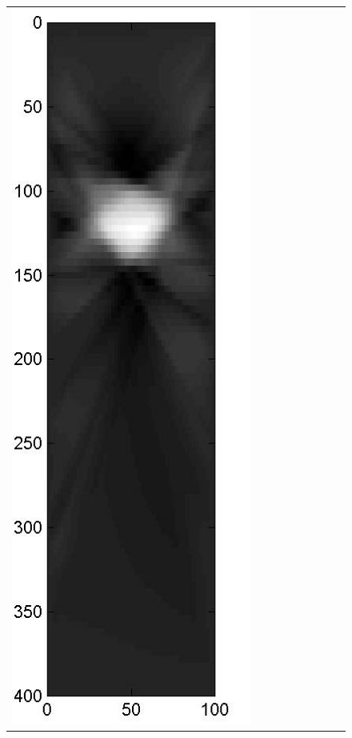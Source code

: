 \documentclass[11pt]{article}
\begin{document}
{\begin{figure}[!h]
\begin{center}
\begin{tabular}{|c|c|c|c|c|c|c|c|c|}
			\includegraphics[width=.9\iwidth]{figures/newFigs/noisy/resultsExp-2-mk}
			&

\end{tabular}
\end{center}
\end{figure}}
\end{document}
